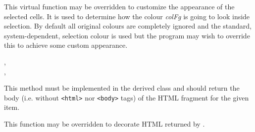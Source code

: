 This virtual function may be overridden to customize the appearance of the
selected cells. It is used to determine how the colour {\it colFg} is going to
look inside selection. By default all original colours are completely ignored
and the standard, system-dependent, selection colour is used but the program
may wish to override this to achieve some custom appearance.


,\\
,\\


\label{wxhtmllistboxongetitem}


This method must be implemented in the derived class and should return
the body (i.e. without {\tt <html>} nor {\tt <body>} tags) of the HTML fragment
for the given item.


\label{wxhtmllistboxongetitemmarkup}


This function may be overridden to decorate HTML returned by
.

